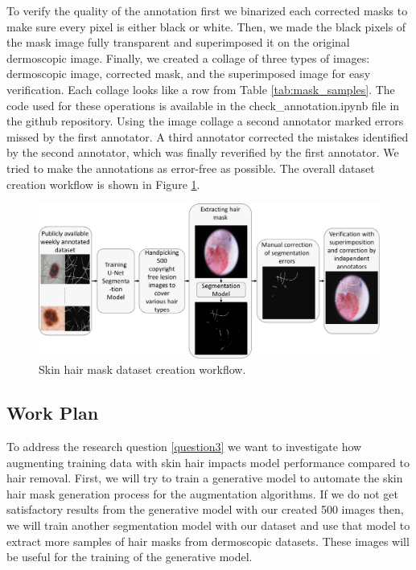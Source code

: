 To verify the quality of the annotation first we binarized each corrected masks to make sure every pixel is either black or white. Then, we made the black pixels of the mask image fully transparent and superimposed it on the original dermoscopic image. Finally, we created a collage of three types of images: dermoscopic image, corrected mask, and the superimposed image for easy verification. Each collage looks like a row from Table \ref{tab:mask_samples}. The code used for these operations is available in the check\_annotation.ipynb file in the github repository. Using the image collage a second annotator marked errors missed by the first annotator. A third annotator corrected the mistakes identified by the second annotator, which was finally reverified by the first annotator. We tried to make the annotations as error-free as possible. The overall dataset creation workflow is shown in Figure \ref{fig:mask_data_creation}. 
\begin{figure}[htb!]
	\centering
	\includegraphics[width=\textwidth,keepaspectratio]{images/ongoing/SkinHair-cropped.pdf}
	\caption{Skin hair mask dataset creation workflow.}
	\label{fig:mask_data_creation}
\end{figure}

\subsection{Work Plan}\label{sec:hair_plan}
To address the research question \ref{question3} we want to investigate how augmenting training data with skin hair impacts model performance compared to hair removal. First, we will try to train a generative model to automate the skin hair mask generation process for the augmentation algorithms. If we do not get satisfactory results from the generative model with our created 500 images then, we will train another segmentation model with our dataset and use that model to extract more samples of hair masks from dermoscopic datasets. These images will be useful for the training of the generative model. 

